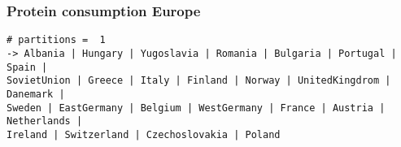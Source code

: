 \begin{frame}[fragile, t, label=last-aliments]
\frametitle{Protein consumption Europe \hyperlink{first-aliments<1>}{}}
\scriptsize
\begin{verbatim}
# partitions =  1
-> Albania | Hungary | Yugoslavia | Romania | Bulgaria | Portugal | Spain | 
SovietUnion | Greece | Italy | Finland | Norway | UnitedKingdrom | Danemark | 
Sweden | EastGermany | Belgium | WestGermany | France | Austria | Netherlands | 
Ireland | Switzerland | Czechoslovakia | Poland
\end{verbatim}

\end{frame}